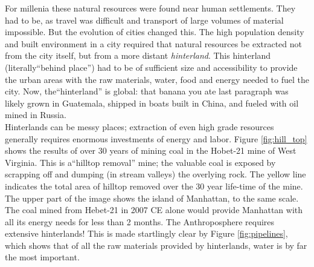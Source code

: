 \documentclass[amstex,12pt]{book}
\begin{document}
For millenia these natural resources were found near human settlements. They had to be, as travel was difficult and transport of large volumes of material impossible. But the evolution of cities changed this. The high population density and built environment in a city required that natural resources be extracted not from the city itself, but from a  more distant \emph{hinterland}. This hinterland (literally``behind place'') had to be of sufficient size and accessibility to provide the urban areas with the raw materials, water, food and energy needed to fuel the city. Now, the``hinterland'' is global: that banana you ate last paragraph was likely grown in Guatemala, shipped in boats built in China, and fueled with oil mined in Russia.\\

Hinterlands can be messy places; extraction of even high grade resources generally requires enormous investments of energy and labor. Figure \ref{fig:hill_top} shows the results of over 30 years of mining coal in the Hobet-21 mine of West Virginia. This is a``hilltop removal'' mine; the valuable coal is exposed by scrapping off and dumping (in stream valleys) the overlying rock. The yellow line indicates the total area of hilltop removed over the 30 year life-time of the mine. The upper part of the image shows the island of Manhattan, to the same scale. The coal mined from Hebet-21 in 2007 CE alone would provide Manhattan with all its energy needs for less than 2 months. The Anthroposphere requires extensive hinterlands! This is made startlingly clear by Figure \ref{fig:pipelines}, which shows that of all the raw materials provided by hinterlands, water is by far the most important. \\
\end{document}

